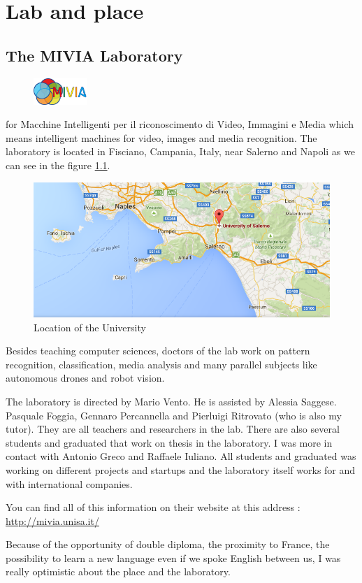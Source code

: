 \chapter{Lab and place}
\section{The MIVIA Laboratory}

\begin{figure}
	\vspace{-7mm}
	\includegraphics[width=2cm]{images_not_compressed/MIVIALogo.jpg}
	\end{figure}
 for Macchine Intelligenti per il riconoscimento di Video, Immagini e Media which means intelligent machines for video, images and media recognition. The laboratory is located in Fisciano, Campania, Italy, near Salerno and Napoli as we can see in the figure \ref{location}.
 \begin{figure}[h]
 \begin{center}
	 \includegraphics[width=15cm]{images_not_compressed/geoUniversity.png}
		\caption{Location of the University}
		\label{location}
	 \end{center}
 \end{figure}
 \par Besides teaching computer sciences, doctors of the lab work on pattern recognition, classification, media analysis and many parallel subjects like autonomous drones and robot vision.
 \par The laboratory is directed by Mario Vento. He is assisted by Alessia Saggese. Pasquale Foggia, Gennaro Percannella and Pierluigi Ritrovato (who is also my tutor). They are all teachers and researchers in the lab. There are also several students and graduated that work on thesis in the laboratory. I was more in contact with Antonio Greco and Raffaele Iuliano. All students and graduated was working on different projects and startups and the laboratory itself works for and with international companies.
 \par You can find all of this information on their website at this address : \url{http://mivia.unisa.it/}
 \par Because of the opportunity of double diploma, the proximity to France, the possibility to learn a new language even if we spoke English between us, I was really optimistic about the place and the laboratory.
